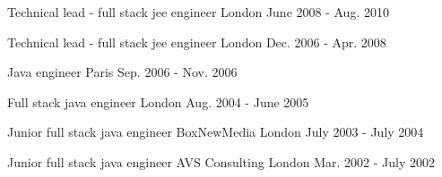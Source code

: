 

\begin{cventries}

  \cventry
    {Technical lead - full stack jee engineer} %
    {} %
    {London} %
    {June 2008 - Aug. 2010} %
    {} %
    {}

  \cventry
    {Technical lead - full stack jee engineer} %
    {} %
    {London} %
    {Dec. 2006 - Apr. 2008} %
    {} %
    {}

  \cventry
    {Java engineer} %
    {} %
    {Paris} %
    {Sep. 2006 - Nov. 2006} %
    {} %
    {}

  \cventry
    {Full stack java engineer} %
    {} %
    {London} %
    {Aug. 2004 - June 2005} %
    {} %
    {}

  \cventry
    {Junior full stack java engineer} %
    {BoxNewMedia} %
    {London} %
    {July 2003 - July 2004} %
    {} %
    {}

  \cventry
    {Junior full stack java engineer} %
    {AVS Consulting} %
    {London} %
    {Mar. 2002 - July 2002} %
    {} %
    {}

\end{cventries}
